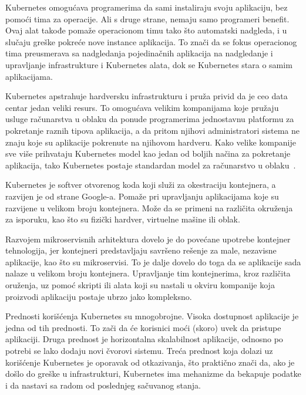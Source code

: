 Kubernetes omogućava programerima da sami instaliraju svoju aplikaciju, bez pomoći tima za operacije. Ali s druge 
strane, nemaju samo programeri benefit. Ovaj alat takođe pomaže operacionom timu tako što automatski nadgleda, 
i u slučaju greške pokreće nove instance aplikacija. To znači da se fokus operacionog tima preusmerava sa nadgledanja
pojedinačnih aplikacija na nadgledanje i upravljanje infrastrukture i Kubernetes alata, dok se Kubernetes stara o samim
aplikacijama.

Kubernetes apstrahuje hardversku infrastrukturu i pruža privid da je ceo data centar jedan veliki resurs. To omogućava
velikim kompanijama koje pružaju usluge računarstva u oblaku da ponude programerima jednostavnu platformu za pokretanje
raznih tipova aplikacija, a da pritom njihovi administratori sistema ne znaju koje su aplikacije pokrenute na njihovom
hardveru. Kako velike kompanije sve više prihvataju Kubernetes model kao jedan od boljih načina za pokretanje aplikacija,
tako Kubernetes postaje standardan model za računarstvo u oblaku~\cite{KIA}.

Kubernetes je softver otvorenog koda koji služi za okestraciju kontejnera, a razvijen je od 
strane Google-a. Pomaže pri upravljanju aplikacijama koje su razvijene u velikom broju 
kontejnera. Može da se primeni na različita okruženja za isporuku, kao što su fizički 
hardver, virtuelne mašine ili oblak.

Razvojem mikroservisnih arhitektura dovelo je do povećane upotrebe kontejner tehnologija, jer 
kontejneri predstavljaju savršeno rešenje za male, nezavisne aplikacije, kao što su mikroservisi. 
To je dalje dovelo do toga da se aplikacije sada nalaze u velikom broju kontejnera. Upravljanje 
tim kontejnerima, kroz različita oruženja, uz pomoć skripti ili alata koji su nastali u okviru 
kompanije koja proizvodi aplikaciju postaje ubrzo jako kompleksno.

Prednosti korišćenja Kubernetes su mnogobrojne. Visoka dostupnost aplikacije je jedna od tih prednosti. 
To zači da će korisnici moći (skoro) uvek da pristupe aplikaciji. Druga prednost je horizontalna 
skalabilnost aplikacije, odnosno po potrebi se lako dodaju novi čvorovi sistemu. Treća prednost koja 
dolazi uz korišćenje Kubernetes je oporavak od otkazivanja, što praktično znači da, ako je došlo do 
greške u infrastrukturi, Kubernetes ima mehanizme da bekapuje podatke i da nastavi sa radom od 
poslednjeg sačuvanog stanja.

